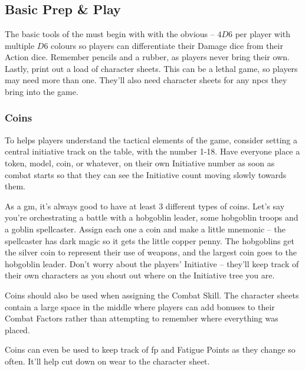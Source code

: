 \chapter{}

\section{Basic Prep \& Play}

\begin{multicols}{2}

\noindent
The basic tools of the  must begin with with the obvious -- $4D6$ per player with multiple $D6$ colours so players can differentiate their Damage dice from their Action dice.
Remember pencils and a rubber, as players never bring their own.
Lastly, print out a load of character sheets.
This can be a lethal game, so players may need more than one.
They'll also need character sheets for any \glspl{npc} they bring into the game.

\subsection{Coins}

To helps players understand the tactical elements of the game, consider setting a central initiative track on the table, with the number 1-18.
Have everyone place a token, model, coin, or whatever, on their own Initiative number as soon as combat starts so that they can see the Initiative count moving slowly towards them.

As a \gls{gm}, it's always good to have at least 3 different types of coins.
Let's say you're orchestrating a battle with a hobgoblin leader, some hobgoblin troops and a goblin spellcaster.
Assign each one a coin and make a little mnemonic -- the spellcaster has dark magic so it gets the little copper penny.
The hobgoblins get the silver coin to represent their use of weapons, and the largest coin goes to the hobgoblin leader.
Don't worry about the players' Initiative -- they'll keep track of their own characters as you shout out where on the Initiative tree you are.

Coins should also be used when assigning the Combat Skill.
The character sheets contain a large space in the middle where players can add bonuses to their Combat Factors rather than attempting to remember where everything was placed.

Coins can even be used to keep track of \gls{fp} and Fatigue Points as they change so often.
It'll help cut down on wear to the character sheet.


\end{multicols}
